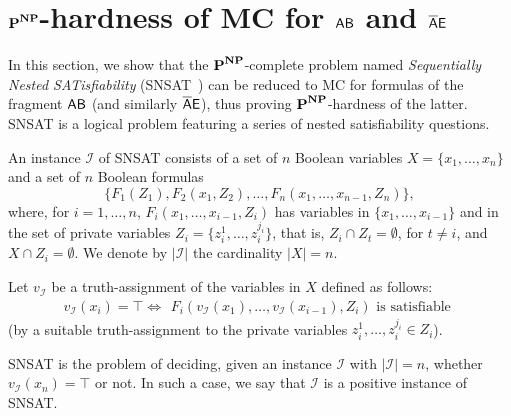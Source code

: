 \section{$\textbf{P}^{\textbf{NP}}$-hardness of MC for $\mathsf{AB}$ and $\mathsf{\overline{A}E}$}\label{sec:ABhard}

In this section, we show that the $\textbf{P}^{\textbf{NP}}$-complete problem named \emph{Sequentially Nested SATisfiability} (SNSAT~\cite{LMS01}) can be reduced to MC for formulas of the fragment $\mathsf{AB}$ (and similarly $\mathsf{\overline{A}E}$), thus proving $\textbf{P}^{\textbf{NP}}$-hardness of the latter.
%
SNSAT 
is a logical problem featuring a series of nested satisfiability questions.

\begin{definition}\label{snsat}
An instance $\mathcal{I}$ of SNSAT consists of 
    a set of $n$ Boolean variables $X=\{x_1,\ldots ,x_n\}$ and
   a set of $n$ Boolean formulas 
\[\{F_1(Z_1), F_2(x_1,Z_2),\ldots , F_n(x_1,\ldots , x_{n-1}, Z_n)\}, \] where, for $i=1,\ldots , n$, $F_i(x_1, \ldots ,x_{i-1},Z_i)$ has variables in $\{x_1, \ldots ,x_{i-1}\}$ and in the set of private variables $Z_i=\{z_i^1,\ldots ,z_i^{j_i}\}$, 
%
% 
that is, $Z_i\cap Z_t=\emptyset$, for $t \neq i$, and $X\cap Z_i=\emptyset$.
We denote by $|\mathcal{I}|$ the cardinality $|X| =n$.

Let $v_\mathcal{I}$ be a truth-assignment of the variables in $X$ defined as follows: 
\[
    v_\mathcal{I}(x_i)=\top \iff
    \begin{array}{l}
        F_i(v_\mathcal{I}(x_1), \ldots, v_\mathcal{I}(x_{i-1}), Z_i)\text{ is satisfiable} 
    \end{array}
\]
(by a suitable truth-assignment  to the private
variables $z_i^1,\ldots ,z_i^{j_i}\in Z_i$).  
 
SNSAT is the problem of deciding, given an instance $\mathcal{I}$ with $|\mathcal{I}|=n$, whether
$v_\mathcal{I}(x_n)=\top$ or not. In such a case, we say that $\mathcal{I}$ is a positive instance of SNSAT.
\end{definition}

